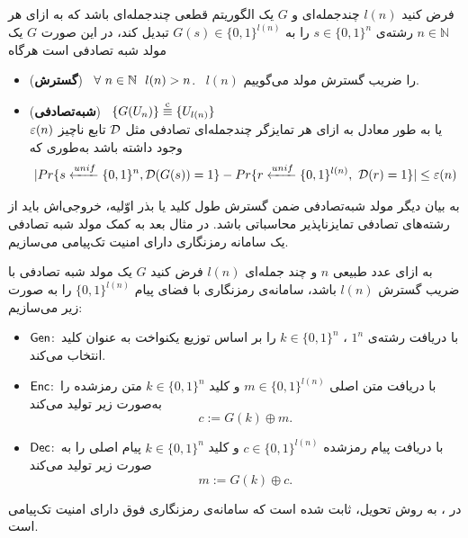  \begin{definition}
 	\cite{katz2014introduction}
فرض کنید
$l(n)$
 چندجمله‌ای و 
  $G$
   یک الگوریتم قطعی چندجمله‌ای باشد که به ازای هر 
   $n\in\mathbb{N}$
  رشته‌ی 
   $s\in\{0, 1\}^{n}$
   را به 
   $G(s)\in\{0,1 \}^{l(n)}$
   تبدیل کند، در این صورت 
   $G$
   یک مولد  شبه تصادفی است هر‌گاه
  \begin{itemize}
     \item
     (\textbf{گسترش}) \ 
     $\fa \ n\in\mathbb{N} \  \ l(n) > n$. 
       \ 
       $l(n)$
       را ضریب گسترش مولد  می‌گوییم.
     \item
     (\textbf{شبه‌تصادفی}) \ 
     $\{G(U_{n})\}\stackrel{\text{c}}{\equiv} \{U_{l(n)}\}$\\
     یا به طور معادل به ازای هر تمایز‌گر چندجمله‌ای تصادفی مثل 
     $\mathcal{D}$
     تابع ناچیز 
     $\varepsilon(n)$
وجود  داشته باشد به‌طوری که
     $$|Pr\{s\xleftarrow[]{{\tiny unif}}\{0, 1\}^{n}, \AdvD(G(s)) = 1\} - Pr\{r\xleftarrow[]{{\tiny unif}} \{0, 1\}^{l(n)}, \ \AdvD(r) = 1\}| \leq \eps(n)$$
  \end{itemize}
\end{definition}
 
به بیان دیگر مولد شبه‌تصادفی ضمن گسترش طول کلید یا بذر 
اوّلیه، خروجی‌اش باید از رشته‌های تصادفی تمایزناپذیر محاسباتی باشد. در مثال بعد به کمک مولد  شبه تصادفی یک سامانه رمزنگاری دارای امنیت تک‌‌پیامی می‌سازیم.
\begin{example}
	\label{tpexample}
	به ازای عدد طبیعی 
	$n$
	 و چند جمله‌ای 
	 $l(n)$
	  فرض کنید 
	  $G$
	  یک مولد  شبه تصادفی با ضریب گسترش 
	  $l(n)$
	   باشد، سامانه‌ی رمزنگاری با فضای پیام 
	   $\{0, 1\}^{l(n)}$
 	   را به صورت زیر می‌سازیم:
\begin{itemize}
\item
$\mathsf{Gen}$:\ 
با دریافت رشته‌ی 
$1^{n}$
، 
$k\in\{0, 1\}^{n}$
را بر اساس توزیع یکنواخت به عنوان کلید انتخاب می‌کند.
\item
$\mathsf{Enc}$:\ 
با دریافت متن اصلی 
$m\in\{0, 1\}^{l(n)}$
و کلید 
$k\in\{0, 1\}^{n}$
 متن رمز‌شده را به‌صورت زیر تولید می‌کند
 $$c:=G(k)\oplus m.$$
 \item
 $\mathsf{Dec}$:\ 
 با دریافت پیام رمز‌شده 
 $c\in\{0, 1\}^{l(n)}$
 و کلید 
 $k\in\{0, 1\}^{n}$
 پیام اصلی را به صورت زیر تولید می‌کند
 $$m:= G(k)\oplus c.$$
\end{itemize}
در 
{\small \cite{katz2014introduction}}، 
به روش تحویل، ثابت شده است که سامانه‌ی رمزنگاری فوق دارای امنیت تک‌پیامی است. 
\end{example}

